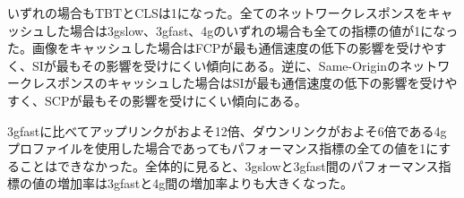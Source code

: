 いずれの場合もTBTとCLSは1になった。全てのネットワークレスポンスをキャッシュした場合は3gslow、3gfast、4gのいずれの場合も全ての指標の値が1になった。画像をキャッシュした場合はFCPが最も通信速度の低下の影響を受けやすく、SIが最もその影響を受けにくい傾向にある。逆に、Same-Originのネットワークレスポンスのキャッシュした場合はSIが最も通信速度の低下の影響を受けやすく、SCPが最もその影響を受けにくい傾向にある。

3gfastに比べてアップリンクがおよそ12倍、ダウンリンクがおよそ6倍である4gプロファイルを使用した場合であってもパフォーマンス指標の全ての値を1にすることはできなかった。全体的に見ると、3gslowと3gfast間のパフォーマンス指標の値の増加率は3gfastと4g間の増加率よりも大きくなった。